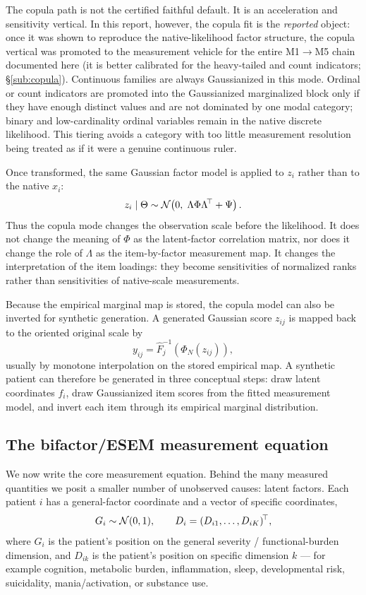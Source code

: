 The copula path is not the certified faithful default. It is an acceleration and sensitivity vertical. In this
report, however, the copula fit is the \emph{reported} object: once it was shown to reproduce the
native-likelihood factor structure, the copula vertical was promoted to the measurement vehicle for the entire
M1$\rightarrow$M5 chain documented here (it is better calibrated for the heavy-tailed and count indicators;
\S\ref{sub:copula}). Continuous
families are always Gaussianized in this mode. Ordinal or count indicators are promoted into the Gaussianized
marginalized block only if they have enough distinct values and are not dominated by one modal category; binary
and low-cardinality ordinal variables remain in the native discrete likelihood. This tiering avoids a category
with too little measurement resolution being treated as if it were a genuine continuous ruler.

Once transformed, the same Gaussian factor model is applied to $z_i$ rather than to the native $x_i$:
\begin{equation}
\label{eq:copula_gaussian_model}
z_i \mid \Theta \sim \mathcal{N}\!\left(0,\;\Lambda\Phi\Lambda^{\!\top}+\Psi\right).
\end{equation}
Thus the copula mode changes the observation scale before the likelihood. It does not change the meaning of
$\Phi$ as the latent-factor correlation matrix, nor does it change the role of $\Lambda$ as the item-by-factor
measurement map. It changes the interpretation of the item loadings: they become sensitivities of normalized
ranks rather than sensitivities of native-scale measurements.

Because the empirical marginal map is stored, the copula model can also be inverted for synthetic generation.
A generated Gaussian score $z_{ij}$ is mapped back to the oriented original scale by
\begin{equation}
\label{eq:copula_inverse}
y_{ij}=\widehat F_j^{-1}\!\left(\Phi_N(z_{ij})\right),
\end{equation}
usually by monotone interpolation on the stored empirical map. A synthetic patient can therefore be generated in
three conceptual steps: draw latent coordinates $f_i$, draw Gaussianized item scores from the fitted measurement
model, and invert each item through its empirical marginal distribution.

\subsection{The bifactor/ESEM measurement equation}
\label{sub:generative}
We now write the core measurement equation. Behind the many measured quantities we posit a smaller number of
unobserved causes: latent factors. Each patient $i$ has a general-factor coordinate and a vector of specific
coordinates,
\begin{equation}
G_i\sim\mathcal{N}(0,1),\qquad D_i=(D_{i1},\dots,D_{iK})^{\!\top},
\end{equation}
where $G_i$ is the patient's position on the general severity / functional-burden dimension, and $D_{ik}$ is the
patient's position on specific dimension $k$ --- for example cognition, metabolic burden, inflammation, sleep,
developmental risk, suicidality, mania/activation, or substance use.

